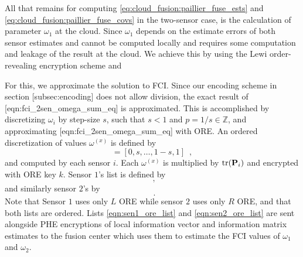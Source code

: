 All that remains for computing \eqref{eq:cloud_fusion:paillier_fuse_ests} and \eqref{eq:cloud_fusion:paillier_fuse_covs} in the two-sensor case, is the calculation of parameter $\omega_1$ at the cloud. Since $\omega_1$ depends on the estimate errors of both sensor estimates and cannot be computed locally and requires some computation and leakage of the result at the cloud. We achieve this by using the Lewi order-revealing encryption scheme and 

For this, we approximate the solution to FCI. Since our encoding scheme in section [subsec:encoding] does not allow division, the exact result of [eqn:fci\_2sen\_omega\_sum\_eq] is approximated. This is accomplished by discretizing $\omega_i$ by step-size $s$, such that $s<1$ and $p=1/s \in \mathbb{Z}$, and approximating [eqn:fci\_2sen\_omega\_sum\_eq] with ORE. An ordered discretization of values $\omega^{(x)}$ is defined by
\begin{equation}
    [\omega^{(1)},\dots,\omega^{(p)}] = [0,s,\dots,1-s,1]\enspace,
\end{equation}
and computed by each sensor $i$. Each $\omega^{(x)}$ is multiplied by $\operatorname{tr}({{\mathbf{P}}}_i)$ and encrypted with ORE key $k$. Sensor $1$'s list is defined by 
\begin{equation}
    [\mathcal{E}^L_{ORE}(\omega^{(1)}\tr(\mP_1)),\dots,\mathcal{E}^L_{ORE}(\omega^{(p)}\tr(\mP_1))]\enspace, \label{eqn:sen1_ore_list}
\end{equation}
and similarly sensor $2$'s by
\begin{equation}
    [\mathcal{E}^R_{ORE}(\omega^{(1)}\tr(\mP_2)),\dots,\mathcal{E}^R_{ORE}(\omega^{(p)}\tr(\mP_2))]\enspace. \label{eqn:sen2_ore_list}
\end{equation}
Note that Sensor $1$ uses only $L$ ORE while sensor $2$ uses only $R$ ORE, and that both lists are ordered. Lists \eqref{eqn:sen1_ore_list} and \eqref{eqn:sen2_ore_list} are sent alongside PHE encryptions of local information vector and information matrix estimates to the fusion center which uses them to estimate the FCI values of $\omega_1$ and $\omega_2$.

